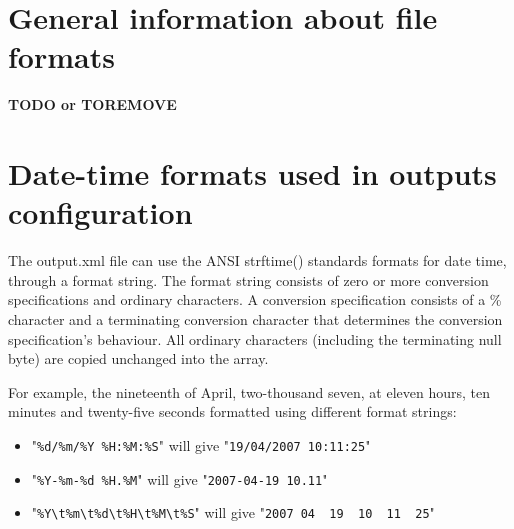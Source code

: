 \section{General information about file formats}

\textbf{TODO or TOREMOVE}

\section{Date-time formats used in outputs configuration}

The output.xml file can use the ANSI strftime() standards formats for date time, through a format string. 
The format string consists of zero or more conversion specifications and ordinary characters.
A conversion specification consists of a \% character and a terminating conversion character that determines the conversion specification's behaviour.
All ordinary characters (including the terminating null byte) are copied unchanged into the array.

\bigskip

For example, the nineteenth of April, two-thousand seven, at eleven hours, ten minutes and twenty-five seconds formatted using different format strings:
\begin{itemize}
\item "\verb|%d/%m/%Y %H:%M:%S|" will give "\verb|19/04/2007 10:11:25|"
\item "\verb|%Y-%m-%d %H.%M|" will give "\verb|2007-04-19 10.11|"
\item "\verb|%Y\t%m\t%d\t%H\t%M\t%S|" will give "\verb|2007	04	19	10	11	25|"
\end{itemize}

\bigskip 


